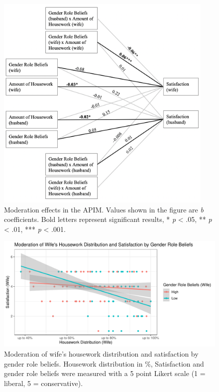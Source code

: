 \documentclass[
  man,floatsintext]{apa6}
\begin{document}
\begin{figure}
\includegraphics[width=4.11in]{moderation} \caption{Moderation effects in the APIM. Values shown in the figure are \emph{b} coefficients. Bold letters represent significant results, * \emph{p} \textless{} .05, ** \emph{p} \textless{} .01, *** \emph{p} \textless{} .001.}\label{fig:unnamed-chunk-54}
\end{figure}



\begin{figure}
\centering
\includegraphics{Final_Paper_files/figure-latex/unnamed-chunk-57-1.pdf}
\caption{\label{fig:unnamed-chunk-57}Moderation of wife's housework distribution and satisfaction by gender role beliefs. Housework distribution in \%, Satisfaction and gender role beliefs were measured with a 5 point Likert scale (1 = liberal, 5 = conservative).}
\end{figure}
\end{document}
